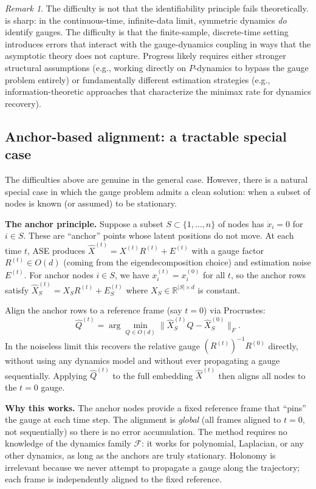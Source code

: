 \documentclass{article}
\newcommand{\RR}{\mathbb{R}}
\theoremstyle{plain}
\theoremstyle{definition}
\theoremstyle{remark}
\newtheorem*{remark}{Remark}
\begin{document}
\begin{remark}
The difficulty is not that the identifiability principle fails theoretically.
 is sharp: in the continuous-time, infinite-data limit, symmetric dynamics \emph{do} identify gauges.
The difficulty is that the finite-sample, discrete-time setting introduces errors that interact with the gauge-dynamics coupling in ways that the asymptotic theory does not capture.
Progress likely requires either stronger structural assumptions (e.g., working directly on $P$-dynamics to bypass the gauge problem entirely) or fundamentally different estimation strategies (e.g., information-theoretic approaches that characterize the minimax rate for dynamics recovery).
\end{remark}


\subsection{Anchor-based alignment: a tractable special case}\label{sec:anchor-alignment}

The difficulties above are genuine in the general case.
However, there is a natural special case in which the gauge problem admits a clean solution: when a subset of nodes is known (or assumed) to be stationary.

\textbf{The anchor principle.}
Suppose a subset $S \subset \{1, \ldots, n\}$ of nodes has $\dot{x}_i = 0$ for $i \in S$. These are ``anchor'' points whose latent positions do not move.
At each time $t$, ASE produces $\hat{X}^{(t)} = X^{(t)} R^{(t)} + E^{(t)}$ with a gauge factor $R^{(t)} \in O(d)$ (coming from the eigendecomposition choice) and estimation noise $E^{(t)}$.
For anchor nodes $i \in S$, we have $x_i^{(t)} = x_i^{(0)}$ for all $t$, so the anchor rows satisfy
$\hat{X}_S^{(t)} = X_S R^{(t)} + E_S^{(t)}$
where $X_S \in \RR^{|S| \times d}$ is constant.

Align the anchor rows to a reference frame (say $t = 0$) via Procrustes:
\begin{equation}
\hat{Q}^{(t)} = \arg \min_{Q \in O(d)} \|\hat{X}_S^{(t)} Q - \hat{X}_S^{(0)}\|_F.
\end{equation}
In the noiseless limit this recovers the relative gauge $(R^{(t)})^{-1} R^{(0)}$ directly, without using any dynamics model and without ever propagating a gauge sequentially.
Applying $\hat{Q}^{(t)}$ to the full embedding $\hat{X}^{(t)}$ then aligns all nodes to the $t=0$ gauge.

\textbf{Why this works.}
The anchor nodes provide a fixed reference frame that ``pins'' the gauge at each time step.
The alignment is \emph{global} (all frames aligned to $t = 0$, not sequentially) so there is no error accumulation.
The method requires no knowledge of the dynamics family $\mathcal{F}$: it works for polynomial, Laplacian, or any other dynamics, as long as the anchors are truly stationary.
Holonomy is irrelevant because we never attempt to propagate a gauge along the trajectory; each frame is independently aligned to the fixed reference.
\end{document}

